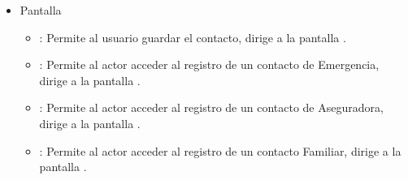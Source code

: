 \begin{itemize}
        \item Pantalla 
        
        \begin{itemize}
            \item {}: Permite al usuario guardar el contacto, dirige a la pantalla .
            \item \btnEmergencia[Emergencia]: Permite al actor acceder al registro de un contacto de Emergencia, dirige a la pantalla .
            \item \btnAseguradora[Aseguradora]: Permite al actor acceder al registro de un contacto de Aseguradora, dirige a la pantalla .
            \item \btnContacto[Familiar]: Permite al actor acceder al registro de un contacto Familiar, dirige a la pantalla . 
        \end{itemize}
    \end{itemize}
